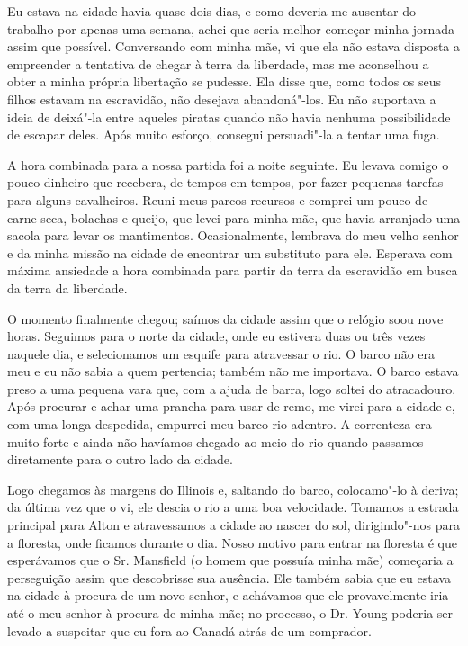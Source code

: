 Eu estava na cidade havia quase dois dias, e como deveria me ausentar do
trabalho por apenas uma semana, achei que seria melhor começar minha
jornada assim que possível. Conversando com minha mãe, vi que ela não
estava disposta a empreender a tentativa de chegar à terra da liberdade,
mas me aconselhou a obter a minha própria libertação se pudesse. Ela
disse que, como todos os seus filhos estavam na escravidão, não desejava
abandoná"-los. Eu não suportava a ideia de deixá"-la entre aqueles piratas
quando não havia nenhuma possibilidade de escapar deles. Após muito
esforço, consegui persuadi"-la a tentar uma fuga.

A hora combinada para a nossa partida foi a noite seguinte. Eu levava
comigo o pouco dinheiro que recebera, de tempos em tempos, por fazer
pequenas tarefas para alguns cavalheiros. Reuni meus parcos recursos e
comprei um pouco de carne seca, bolachas e queijo, que levei para minha
mãe, que havia arranjado uma sacola para levar os mantimentos.
Ocasionalmente, lembrava do meu velho senhor e da minha missão na cidade
de encontrar um substituto para ele. Esperava com máxima ansiedade a
hora combinada para partir da terra da escravidão em busca da terra da
liberdade.

O momento finalmente chegou; saímos da cidade assim que o relógio soou
nove horas. Seguimos para o norte da cidade, onde eu estivera duas ou
três vezes naquele dia, e selecionamos um esquife para atravessar o rio.
O barco não era meu e eu não sabia a quem pertencia; também não me
importava. O barco estava preso a uma pequena vara que, com a ajuda de
barra, logo soltei do atracadouro. Após procurar e achar uma prancha
para usar de remo, me virei para a cidade e, com uma longa despedida,
empurrei meu barco rio adentro. A correnteza era muito forte e ainda não
havíamos chegado ao meio do rio quando passamos diretamente para o outro
lado da cidade.

Logo chegamos às margens do Illinois e, saltando do barco, colocamo"-lo à
deriva; da última vez que o vi, ele descia o rio a uma boa velocidade.
Tomamos a estrada principal para Alton e atravessamos a cidade ao nascer
do sol, dirigindo"-nos para a floresta, onde ficamos durante o dia. Nosso
motivo para entrar na floresta é que esperávamos que o Sr. Mansfield (o
homem que possuía minha mãe) começaria a perseguição assim que
descobrisse sua ausência. Ele também sabia que eu estava na cidade à
procura de um novo senhor, e achávamos que ele provavelmente iria até o
meu senhor à procura de minha mãe; no processo, o Dr. Young poderia ser
levado a suspeitar que eu fora ao Canadá atrás de um comprador.


